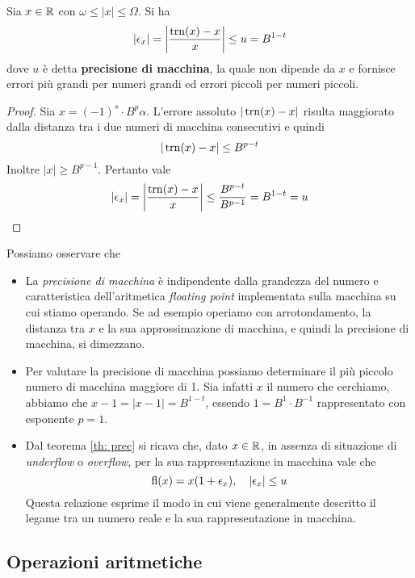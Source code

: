 \begin{theorem}\label{th: prec}
	Sia $x \in \mathbb{R}$ con $\omega \leq |x| \leq \Omega$. Si ha
	\[ |\epsilon_x| = \left| \frac{\operatorname{trn}(x) - x}{x} \right| \leq u = B^{1-t} \]
	dove $u$ è detta \textbf{precisione di macchina}, la quale non dipende da $x$ e fornisce errori più grandi
	per numeri grandi ed errori piccoli per numeri piccoli.
	\begin{proof}
		Sia $x = (-1)^s \cdot B^p \alpha$. L'errore assoluto $|\operatorname{trn}(x) - x|$ risulta maggiorato dalla distanza
		tra i due numeri di macchina consecutivi e quindi
		\[ |\operatorname{trn}(x) - x| \leq B^{p-t} \]
		Inoltre $|x| \geq B^{p-1}$. Pertanto vale
		\[ |\epsilon_x| = \left| \frac{\operatorname{trn}(x) - x}{x} \right| \leq \frac{B^{p-t}}{B^{p-1}} = B^{1-t} = u \]
	\end{proof}
\end{theorem}

\begin{observation}
	Possiamo osservare che
	\begin{itemize}
		\item La \emph{precisione di macchina} è indipendente dalla grandezza del numero e caratteristica
		      dell'aritmetica \emph{floating point} implementata sulla macchina su cui stiamo operando. Se ad
		      esempio operiamo con arrotondamento, la distanza tra $x$ e la sua approssimazione di macchina, e
		      quindi la precisione di macchina, si dimezzano.
		\item Per valutare la precisione di macchina possiamo determinare il più piccolo numero di macchina
		      maggiore di 1. Sia infatti $x$ il numero che cerchiamo, abbiamo che $x - 1 = |x - 1| = B^{1-t}$,
		      essendo $1 = B^1 \cdot B^{-1}$ rappresentato con esponente $p = 1$.
		\item Dal teorema \ref{th: prec} si ricava che, dato $x \in \mathbb{R}$, in assenza di situazione di
		      \emph{underflow} o \emph{overflow}, per la sua rappresentazione in macchina vale che
		      \[ \operatorname{fl}(x) = x (1 + \epsilon_x), \quad |\epsilon_x| \leq u \]
		      Questa relazione esprime il modo in cui viene generalmente descritto il legame tra un numero reale
		      e la sua rappresentazione in macchina.
	\end{itemize}
\end{observation}

\subsection{Operazioni aritmetiche}
